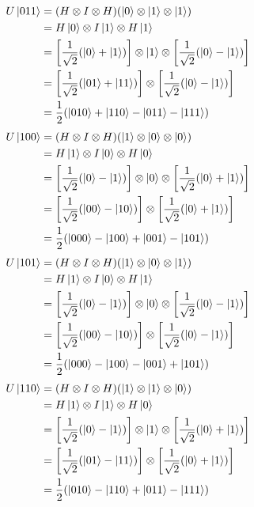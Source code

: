 \documentclass[11pt]{article}
\newcommand{\invroot}[1]{\frac{1}{\sqrt{#1}}}
\begin{document}
\begin{align}
  \begin{split}
    U\ket{011}&=(H\otimes I\otimes H)(\ket{0}\otimes\ket{1}\otimes\ket{1})\\
    &=H\ket{0}\otimes I\ket{1}\otimes H\ket{1}\\
    &=\left[\invroot{2}(\ket{0}+\ket{1})\right]\otimes\ket{1}\otimes\left[\invroot{2}(\ket{0}-\ket{1})\right]\\
    &=\left[\invroot{2}(\ket{01}+\ket{11})\right]\otimes\left[\invroot{2}(\ket{0}-\ket{1})\right]\\
    &=\frac{1}{2}(\ket{010}+\ket{110}-\ket{011}-\ket{111})
  \end{split}
\end{align}
\begin{align}
  \begin{split}
    U\ket{100}&=(H\otimes I\otimes H)(\ket{1}\otimes\ket{0}\otimes\ket{0})\\
    &=H\ket{1}\otimes I\ket{0}\otimes H\ket{0}\\
    &=\left[\invroot{2}(\ket{0}-\ket{1})\right]\otimes\ket{0}\otimes\left[\invroot{2}(\ket{0}+\ket{1})\right]\\
    &=\left[\invroot{2}(\ket{00}-\ket{10})\right]\otimes\left[\invroot{2}(\ket{0}+\ket{1})\right]\\
    &=\frac{1}{2}(\ket{000}-\ket{100}+\ket{001}-\ket{101})
  \end{split}
\end{align}
\begin{align}
  \begin{split}
    U\ket{101}&=(H\otimes I\otimes H)(\ket{1}\otimes\ket{0}\otimes\ket{1})\\
    &=H\ket{1}\otimes I\ket{0}\otimes H\ket{1}\\
    &=\left[\invroot{2}(\ket{0}-\ket{1})\right]\otimes\ket{0}\otimes\left[\invroot{2}(\ket{0}-\ket{1})\right]\\
    &=\left[\invroot{2}(\ket{00}-\ket{10})\right]\otimes\left[\invroot{2}(\ket{0}-\ket{1})\right]\\
    &=\frac{1}{2}(\ket{000}-\ket{100}-\ket{001}+\ket{101})
  \end{split}
\end{align}
\begin{align}
  \begin{split}
    U\ket{110}&=(H\otimes I\otimes H)(\ket{1}\otimes\ket{1}\otimes\ket{0})\\
    &=H\ket{1}\otimes I\ket{1}\otimes H\ket{0}\\
    &=\left[\invroot{2}(\ket{0}-\ket{1})\right]\otimes\ket{1}\otimes\left[\invroot{2}(\ket{0}+\ket{1})\right]\\
    &=\left[\invroot{2}(\ket{01}-\ket{11})\right]\otimes\left[\invroot{2}(\ket{0}+\ket{1})\right]\\
    &=\frac{1}{2}(\ket{010}-\ket{110}+\ket{011}-\ket{111})
  \end{split}
\end{align}
\end{document}
